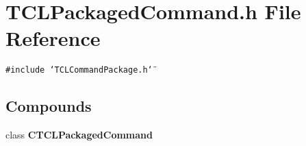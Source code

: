 \section{TCLPackaged\-Command.h File Reference}
\label{TCLPackagedCommand_8h}
{\tt \#include \char`\"{}TCLCommand\-Package.h\char`\"{}}\par
\subsection*{Compounds}
\begin{CompactItemize}
\item 
class {\bf CTCLPackaged\-Command}
\end{CompactItemize}
